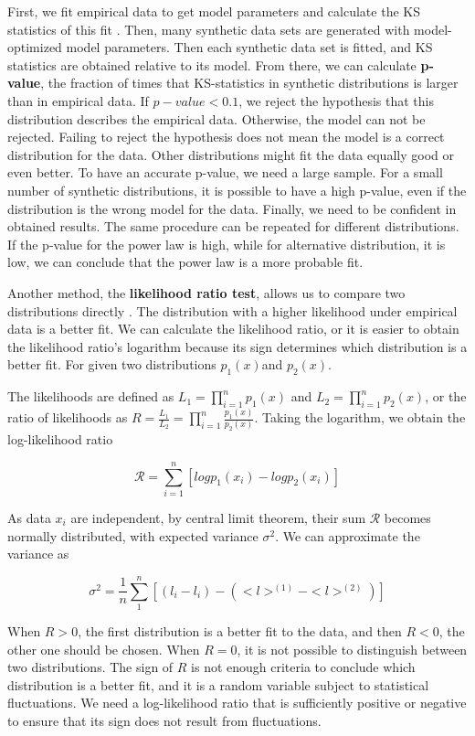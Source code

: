 First, we fit empirical data to get model parameters and calculate the KS statistics of this fit \cite{clauset2009power}. Then, many synthetic data sets are generated with model-optimized model parameters. Then each synthetic data set is fitted, and KS statistics are obtained relative to its model. From there, we can calculate \textbf{p-value}, the fraction of times that KS-statistics in synthetic distributions is larger than in empirical data.  If $p-value<0.1$, we reject the hypothesis that this distribution describes the empirical data. Otherwise, the model can not be rejected. Failing to reject the hypothesis does not mean the model is a correct distribution for the data. Other distributions might fit the data equally good or even better. To have an accurate p-value, we need a large sample. For a small number of synthetic distributions, it is possible to have a high p-value, even if the distribution is the wrong model for the data. Finally, we need to be confident in obtained results. The same procedure can be repeated for different distributions. If the p-value for the power law is high, while for alternative distribution, it is low, we can conclude that the power law is a more probable fit. 

Another method, the \textbf{likelihood ratio test}, allows us to compare two distributions directly \cite{clauset2009power}. The distribution with a higher likelihood under empirical data is a better fit. We can calculate the likelihood ratio, or it is easier to obtain the likelihood ratio's logarithm because its sign determines which distribution is a better fit. For given two distributions $p_1(x)$and $p_2(x)$. 

The likelihoods are defined as $L_1=\prod_{i=1}^{n}p_1(x)$ and $L_2=\prod_{i=1}^{n}p_2(x)$, or the ratio of likelihoods as $R=\frac{L_1}{L_2} = \prod_{i=1}^{n} \frac{p_1(x)}{p_2(x)}$. Taking the logarithm, we obtain the log-likelihood ratio

\begin{equation}
\mathcal{R} = \sum_{i=1}^{n} \left[log p_1(x_i) - log p_2(x_i)\right]
\end{equation}

As data $x_i$ are independent, by central limit theorem, their sum $\mathcal{R}$ becomes normally distributed, with expected variance $\sigma^2$. We can approximate the variance as 

$$\sigma^2 = \frac{1}{n}\sum_{1}^{n}[(l_i - l_i) - (<l>^{(1)}- <l>^{(2)})]$$

When $R>0$, the first distribution is a better fit to the data, and then $R<0$, the other one should be chosen. When $R=0$, it is not possible to distinguish between two distributions. The sign of $R$ is not enough criteria to conclude which distribution is a better fit, and it is a random variable subject to statistical fluctuations. We need a log-likelihood ratio that is sufficiently positive or negative to ensure that its sign does not result from fluctuations.

